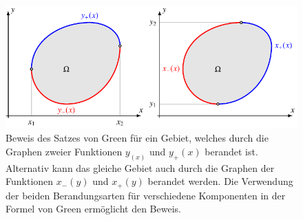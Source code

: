 %
%
%
\begin{figure}
\centering
\includegraphics{chapters/040-felder/images/greenbeweis.pdf}
\caption{Beweis des Satzes von Green für ein Gebiet, welches durch
die Graphen zweier Funktionen $y_(x)$ und $y_+(x)$ 
berandet ist.
Alternativ kann das gleiche Gebiet auch durch die Graphen der Funktionen
$x_-(y)$ und $x_+(y)$ berandet werden.
Die Verwendung der beiden Berandungsarten für verschiedene Komponenten
in der Formel von Green ermöglicht den Beweis.
\label{buch:felder:fundamentallemma:fig:greenbeweis}}
\end{figure}
